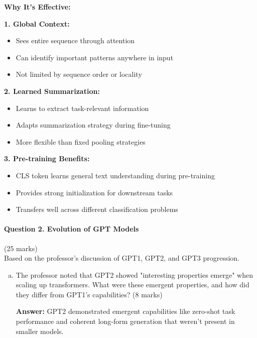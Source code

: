 \documentclass[12pt]{article}
\newcommand{\answer}[1]{{\color{answercolor}\textbf{Answer:} #1}}
\begin{document}
\begin{enumerate}
\begin{enumerate}[(a)]
{    \textbf{Why It's Effective:}
    
    \textbf{1. Global Context:}
    \begin{itemize}
        \item Sees entire sequence through attention
        \item Can identify important patterns anywhere in input
        \item Not limited by sequence order or locality
    \end{itemize}
    
    \textbf{2. Learned Summarization:}
    \begin{itemize}
        \item Learns to extract task-relevant information
        \item Adapts summarization strategy during fine-tuning
        \item More flexible than fixed pooling strategies
    \end{itemize}
    
    \textbf{3. Pre-training Benefits:}
    \begin{itemize}
        \item CLS token learns general text understanding during pre-training
        \item Provides strong initialization for downstream tasks
        \item Transfers well across different classification problems
    \end{itemize}
    }
\end{enumerate}

\newpage
\paragraph{Question 2. Evolution of GPT Models}\hfill (25 marks)\\
Based on the professor's discussion of GPT1, GPT2, and GPT3 progression.

\begin{enumerate}[(a)]
    \item The professor noted that GPT2 showed "interesting properties emerge" when scaling up transformers. What were these emergent properties, and how did they differ from GPT1's capabilities? \hfill (8 marks)
    
    \answer{GPT2 demonstrated emergent capabilities like zero-shot task performance and coherent long-form generation that weren't present in smaller models.}
    

\end{enumerate}
\end{enumerate}
\end{document}
